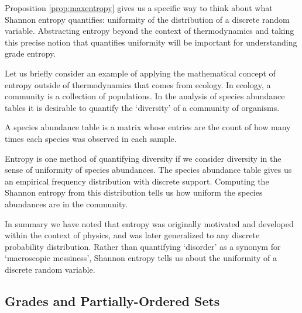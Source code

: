 \documentclass[
  letterpaper,
  DIV=11,
  numbers=noendperiod]{scrreprt}
\begin{document}
Proposition \ref{prop:maxentropy} gives us a specific way to think about
what Shannon entropy quantifies: uniformity of the distribution of a
discrete random variable. Abstracting entropy beyond the context of
thermodynamics and taking this precise notion that quantifies uniformity
will be important for understanding grade entropy.

Let us briefly consider an example of applying the mathematical concept
of entropy outside of thermodynamics that comes from ecology. In
ecology, a community is a collection of populations. In the analysis of
species abundance tables it is desirable to quantify the `diversity' of
a community of organisms.

\begin{tcolorbox}[enhanced jigsaw, colframe=quarto-callout-note-color-frame, toptitle=1mm, bottomtitle=1mm, breakable, colbacktitle=quarto-callout-note-color!10!white, arc=.35mm, coltitle=black, opacitybacktitle=0.6, opacityback=0, leftrule=.75mm, titlerule=0mm, title=\textcolor{quarto-callout-note-color}{\faInfo}\hspace{0.5em}{What is a species abundance table?}, rightrule=.15mm, toprule=.15mm, colback=white, bottomrule=.15mm, left=2mm]

A species abundance table is a matrix whose entries are the count of how
many times each species was observed in each sample.

\end{tcolorbox}

Entropy is one method of quantifying diversity if we consider diversity
in the sense of uniformity of species abundances. The species abundance
table gives us an empirical frequency distribution with discrete
support. Computing the Shannon entropy from this distribution tells us
how uniform the species abundances are in the community.

In summary we have noted that entropy was originally motivated and
developed within the context of physics, and was later generalized to
any discrete probability distribution. Rather than quantifying
`disorder' as a synonym for `macroscopic messiness', Shannon entropy
tells us about the uniformity of a discrete random variable.

\subsection{Grades and Partially-Ordered
Sets}\label{grades-and-partially-ordered-sets}
\end{document}
